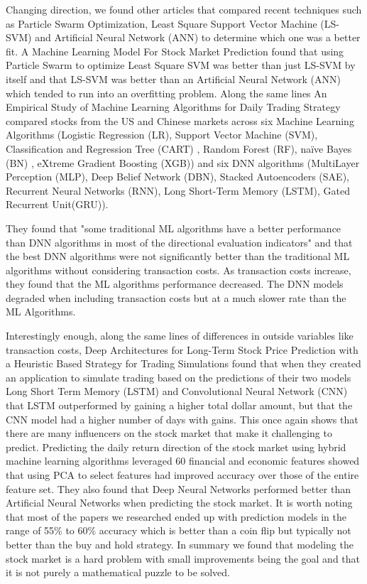 \documentclass[conference]{IEEEtran}
\begin{document}
Changing direction, we found other articles that compared recent techniques such as Particle Swarm Optimization, Least Square Support Vector Machine (LS-SVM) and Artificial Neural Network (ANN) to determine which one was a better fit.  A Machine Learning Model For Stock Market Prediction \cite{MLModelPrediction} found that using Particle Swarm to optimize Least Square SVM was better than just LS-SVM by itself and that LS-SVM was better than an Artificial Neural Network (ANN) which tended to run into an overfitting problem. Along the same lines An Empirical Study of Machine Learning Algorithms for Daily Trading Strategy \cite{EmpiricalStudy} compared stocks from the US and Chinese markets across six Machine Learning Algorithms (Logistic Regression (LR), Support Vector Machine (SVM), Classification and Regression Tree (CART) , Random Forest (RF), naïve Bayes (BN) , eXtreme Gradient Boosting (XGB)) and six DNN algorithms (MultiLayer Perception (MLP), Deep Belief Network (DBN), Stacked Autoencoders (SAE), Recurrent Neural Networks (RNN), Long Short-Term Memory (LSTM), Gated Recurrent Unit(GRU)). 

They found that "some traditional ML algorithms have a better performance than DNN algorithms in most of the directional evaluation indicators" and that the best DNN algorithms were not significantly better than the traditional ML algorithms without considering transaction costs.  As transaction costs increase, they found that the ML algorithms performance decreased.  The DNN models degraded when including transaction costs but at a much slower rate than the ML Algorithms.

Interestingly enough, along the same lines of differences in outside variables like transaction costs, Deep Architectures for Long-Term Stock Price Prediction with a Heuristic Based Strategy for Trading Simulations \cite{LongTermPricePrediction} found that when they created an application to simulate trading based on the predictions of their two models Long Short Term Memory (LSTM) and Convolutional Neural Network (CNN) that LSTM outperformed by gaining a higher total dollar amount, but that the CNN model had a higher number of days with gains.  This once again shows that there are many influencers on the stock market that make it challenging to predict.
Predicting the daily return direction of the stock market using hybrid machine learning algorithms \cite {DailyReturnDirection} leveraged 60 financial and economic features showed that using PCA to select features had improved accuracy over those of the entire feature set.  They also found that Deep Neural Networks performed better than Artificial Neural Networks when predicting the stock market.  It is worth noting that most of the papers we researched ended up with prediction models in the range of 55\% to 60\% accuracy which is better than a coin flip but typically not better than the buy and hold strategy.  In summary we found that modeling the stock market is a hard problem with small improvements being the goal and that it is not purely a mathematical puzzle to be solved.
\end{document}
